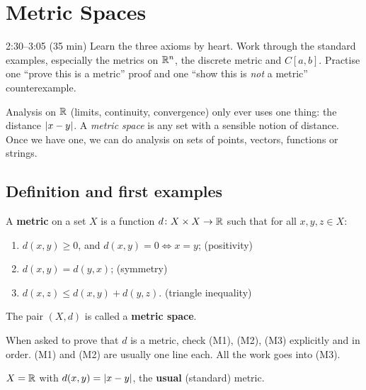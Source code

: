 \chapter{Metric Spaces}\label{ch:1}
\begin{studyslot}{2:30--3:05 (35 min)}
Learn the three axioms by heart. Work through the standard examples, especially the metrics on $\mathbb{R}^n$, the discrete metric and $C[a,b]$. Practise one ``prove this is a metric'' proof and one ``show this is \emph{not} a metric'' counterexample.
\end{studyslot}

\begin{intuition}
Analysis on $\mathbb{R}$ (limits, continuity, convergence) only ever uses one thing: the distance $\left\lvert x-y\right\rvert$. A \emph{metric space} is any set with a sensible notion of distance. Once we have one, we can do analysis on sets of points, vectors, functions or strings.
\end{intuition}

\section{Definition and first examples}
\begin{definition}\label{def:metric}
A \textbf{metric} on a set $X$ is a function $d\colon X\times X\to\mathbb{R}$ such that for all $x,y,z\in X$:
\begin{enumerate}[label=\textbf{(M\arabic*)},leftmargin=3.2em]
  \item $d(x,y)\ge 0$, and $d(x,y)=0 \iff x=y$; \hfill(positivity)
  \item $d(x,y)=d(y,x)$; \hfill(symmetry)
  \item $d(x,z)\le d(x,y)+d(y,z)$. \hfill(triangle inequality)
\end{enumerate}
The pair $(X,d)$ is called a \textbf{metric space}.
\end{definition}

\begin{examtip}
When asked to prove that $d$ is a metric, check \textup{(M1)}, \textup{(M2)}, \textup{(M3)} explicitly and in order. \textup{(M1)} and \textup{(M2)} are usually one line each. All the work goes into \textup{(M3)}.
\end{examtip}

\begin{example}
$X=\mathbb{R}$ with $d(x,y)=\left\lvert x-y\right\rvert$, the \textbf{usual} (standard) metric.
\end{example}

